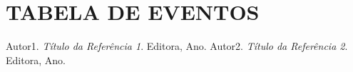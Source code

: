 \documentclass{article}
\begin{document}
\section{TABELA DE EVENTOS}


\newpage
\begin{thebibliography}{9}
   Autor1. \emph{Título da Referência 1}. Editora, Ano.
   Autor2. \emph{Título da Referência 2}. Editora, Ano.
\end{thebibliography}
\end{document}
